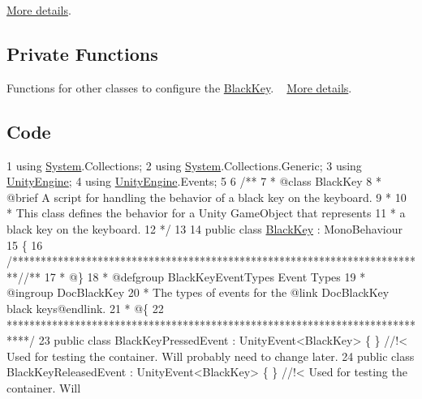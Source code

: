  \hyperlink{group___black_key_unity}{More details}.\hypertarget{group___doc_black_key_DocBlackKeyPubFunc}{}\subsection{Private Functions}\label{group___doc_black_key_DocBlackKeyPubFunc}
Functions for other classes to configure the \hyperlink{class_black_key}{Black\+Key}. ~\newline
 \hyperlink{group___black_key_pub_func}{More details}.\hypertarget{group___doc_black_key_DocBlackKeyCode}{}\subsection{Code}\label{group___doc_black_key_DocBlackKeyCode}

\begin{DoxyCodeInclude}
1 \textcolor{keyword}{using} \hyperlink{namespace_system}{System}.Collections;
2 \textcolor{keyword}{using} \hyperlink{namespace_system}{System}.Collections.Generic;
3 \textcolor{keyword}{using} \hyperlink{namespace_unity_engine}{UnityEngine};
4 \textcolor{keyword}{using} \hyperlink{namespace_unity_engine}{UnityEngine}.Events;
5 \textcolor{comment}{}
6 \textcolor{comment}{/** }
7 \textcolor{comment}{ * @class BlackKey}
8 \textcolor{comment}{ * @brief A script for handling the behavior of a black key on the keyboard.}
9 \textcolor{comment}{ *  }
10 \textcolor{comment}{ * This class defines the behavior for a Unity GameObject that represents}
11 \textcolor{comment}{ * a black key on the keyboard.}
12 \textcolor{comment}{*/}
13 
14 \textcolor{keyword}{public} \textcolor{keyword}{class }\hyperlink{class_black_key}{BlackKey} : MonoBehaviour
15 \{
16     \textcolor{comment}{/*************************************************************************/}\textcolor{comment}{/** }
17 \textcolor{comment}{     * @\}}
18 \textcolor{comment}{     * @defgroup BlackKeyEventTypes Event Types}
19 \textcolor{comment}{     * @ingroup DocBlackKey}
20 \textcolor{comment}{     * The types of events for the @link DocBlackKey black keys@endlink.}
21 \textcolor{comment}{     * @\{}
22 \textcolor{comment}{    ****************************************************************************/}
23     \textcolor{keyword}{public} \textcolor{keyword}{class }BlackKeyPressedEvent : UnityEvent<BlackKey> \{ \} \textcolor{comment}{//!< Used for testing the container. Will
       probably need to change later.}
24 \textcolor{comment}{}    \textcolor{keyword}{public} \textcolor{keyword}{class }BlackKeyReleasedEvent : UnityEvent<BlackKey> \{ \} \textcolor{comment}{//!< Used for testing the container. Will
}
\end{DoxyCodeInclude}
